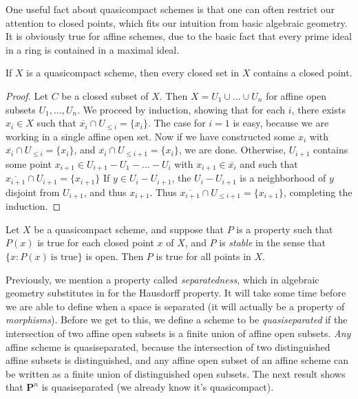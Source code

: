 One useful fact about quasicompact schemes is that one can often restrict our attention to closed points, which fits our intuition from basic algebraic geometry. It is obviously true for affine schemes, due to the basic fact that every prime ideal in a ring is contained in a maximal ideal.

\begin{theorem}
    If $X$ is a quasicompact scheme, then every closed set in $X$ contains a closed point.
\end{theorem}
\begin{proof}
    Let $C$ be a closed subset of $X$. Then $X = U_1 \cup \dots \cup U_n$ for affine open subsets $U_1,\dots,U_n$. We proceed by induction, showing that for each $i$, there exists $x_i \in X$ such that $\overline{x_i} \cap U_{\leq i} = \{ x_i \}$. The case for $i = 1$ is easy, because we are working in a single affine open set. Now if we have constructed some $x_i$ with $\overline{x_i} \cap U_{\leq i} = \{ x_i \}$, and $\overline{x_i} \cap U_{\leq i+1} = \{ x_i \}$, we are done. Otherwise, $U_{i+1}$ contains some point $x_{i+1} \in U_{i+1} - U_1 - \dots - U_i$ with $x_{i+1} \in \overline{x_i}$ and such that $\overline{x_{i+1}} \cap U_{i+1} = \{ x_{i+1} \}$ If $y \in U_i - U_{i+1}$, the $U_i - U_{i+1}$ is a neighborhood of $y$ disjoint from $U_{i+1}$, and thus $x_{i+1}$. Thus $\overline{x_{i+1}} \cap U_{\leq i+1} = \{ x_{i+1} \}$, completing the induction.
\end{proof}

\begin{corollary}
    Let $X$ be a quasicompact scheme, and suppose that $P$ is a property such that $P(x)$ is true for each closed point $x$ of $X$, and $P$ is \emph{stable} in the sense that $\{ x : P(x)\ \text{is true} \}$ is open. Then $P$ is true for all points in $X$.
\end{corollary}

Previously, we mention a property called \emph{separatedness}, which in algebraic geometry substitutes in for the Hausdorff property. It will take some time before we are able to define when a space is separated (it will actually be a property of \emph{morphisms}). Before we get to this, we define a scheme to be \emph{quasiseparated} if the intersection of two affine open subsets is a finite union of affine open subsets. \emph{Any} affine scheme is quasiseparated, because the intersection of two distinguished affine subsets is distinguished, and any affine open subset of an affine scheme can be written as a finite union of distinguished open subsets. The next result shows that $\mathbf{P}^n$ is quasiseparated (we already know it's quasicompact).


